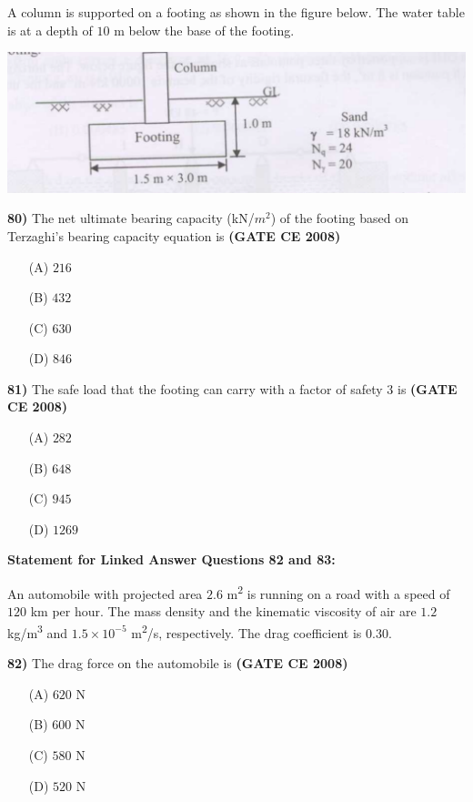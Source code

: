 \documentclass[journal]{IEEEtran}
\begin{document}
\begin{enumerate}
A column is supported on a footing as shown in the figure below. The water table is at a depth of $10$ m below the base of the footing.

\vspace{0.3cm}
\includegraphics[width=\textwidth]{figs/fig13.png} 
\vspace{0.3cm}

\textbf{80)} The net ultimate bearing capacity (kN/$m^{2}$) of the footing based on Terzaghi's bearing capacity equation is \textbf{(GATE CE 2008)}
\begin{itemize}
    \item[(A)] $216$
    \item[(B)] $432$
    \item[(C)] $630$
    \item[(D)] $846$
\end{itemize}

\textbf{81)} The safe load  that the footing can carry with a factor of safety $3$ is \textbf{(GATE CE 2008)}
\begin{itemize}
    \item[(A)] $282$
    \item[(B)] $648$
    \item[(C)] $945$
    \item[(D)] $1269$
\end{itemize}

\vspace{0.5cm}
\textbf{Statement for Linked Answer Questions 82 and 83:}

An automobile with projected area $2.6$ m\textsuperscript{2} is running on a road with a speed of $120$ km per hour. The mass density and the kinematic viscosity of air are $1.2$ kg/m\textsuperscript{3} and $1.5 \times 10^{-5}$ m\textsuperscript{2}/s, respectively. The drag coefficient is $0.30$.

\textbf{82)} The drag force on the automobile is \textbf{(GATE CE 2008)}
\begin{itemize}
    \item[(A)] $620$ N
    \item[(B)] $600$ N
    \item[(C)] $580$ N
    \item[(D)] $520$ N
\end{itemize}


\end{enumerate}
\end{document}

